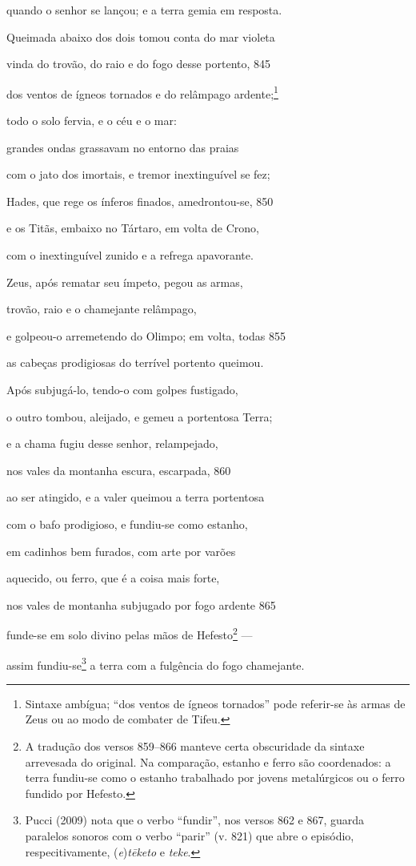quando o senhor se lançou; e a terra gemia em resposta.

Queimada abaixo dos dois tomou conta do mar violeta

vinda do trovão, do raio e do fogo desse portento, \num{845}

dos ventos de ígneos tornados e do relâmpago ardente;\footnote{Sintaxe ambígua; ``dos ventos de ígneos tornados'' pode referir-se às armas de Zeus ou ao modo de combater de Tifeu.}

todo o solo fervia, e o céu e o mar:

grandes ondas grassavam no entorno das praias

com o jato dos imortais, e tremor inextinguível se fez;

Hades, que rege os ínferos finados, amedrontou-se, \num{850}

e os Titãs, embaixo no Tártaro, em volta de Crono,

com o inextinguível zunido e a refrega apavorante.

\quad{}Zeus, após rematar seu ímpeto, pegou as armas,

trovão, raio e o chamejante relâmpago,

e golpeou-o arremetendo do Olimpo; em volta, todas \num{855}

as cabeças prodigiosas do terrível portento queimou.

Após subjugá-lo, tendo-o com golpes fustigado,

o outro tombou, aleijado, e gemeu a portentosa Terra;

e a chama fugiu desse senhor, relampejado,

nos vales da montanha escura, escarpada, \num{860}

ao ser atingido, e a valer queimou a terra portentosa

com o bafo prodigioso, e fundiu-se como estanho,

em cadinhos bem furados, com arte por varões

aquecido, ou ferro, que é a coisa mais forte,

nos vales de montanha subjugado por fogo ardente \num{865}

funde-se em solo divino pelas mãos de Hefesto\footnote{A tradução dos versos 859--866 manteve certa obscuridade da sintaxe arrevesada do original. Na comparação, estanho e ferro são coordenados: a terra
fundiu-se como o estanho trabalhado por jovens metalúrgicos ou o ferro
fundido por Hefesto.} ---

assim fundiu-se\footnote{Pucci (2009) nota que o verbo ``fundir'', nos versos 862 e 867, guarda paralelos sonoros com o verbo ``parir'' (v. 821) que abre o
episódio, respecitivamente, (\emph{e})\emph{tēketo} e \emph{teke}.} a terra com a fulgência do fogo \qb{}chamejante.

